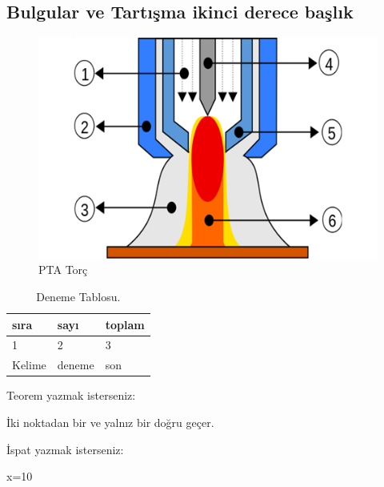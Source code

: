 \subsection{Bulgular ve Tartışma ikinci derece başlık}
\lipsum[1-2]
\begin{figure}[h]
\centering
\includegraphics[width=\textwidth]{gorseller/ptaTorc}
\caption{PTA Torç}\label{fig:PtaTorc1}
\end{figure}
\lipsum[1-2]
\begin{table}
\centering
\caption{Deneme Tablosu.}\label{tab:den1}
\begin{tabular}{|l|l|l|}
\hline
sıra   & sayı   & toplam \\ \hline
1      & 2      & 3      \\ \hline
Kelime & deneme & son    \\ \hline
\end{tabular}
\end{table}

Teorem yazmak isterseniz:
\begin{theorem}[Öklid]
 İki noktadan bir ve yalnız bir doğru geçer.
\end{theorem}

İspat yazmak isterseniz:
\begin{ispat}
x=10
\end{ispat}

